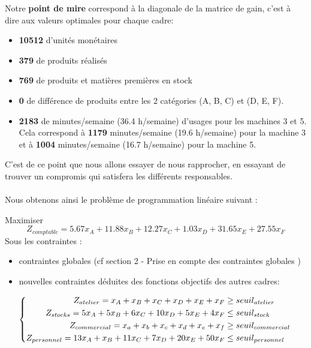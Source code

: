 \documentclass[12pt]{article}
\begin{document}
Notre \textbf{point de mire} correspond à la diagonale de la matrice de gain, c'est à dire aux valeurs optimales pour chaque cadre:
\begin{itemize}
\item \textbf{10512} d'unités monétaires
\item  \textbf{379} de produits réalisés
\item \textbf{769} de produits et matières premières en stock
\item \textbf{0} de différence de produits entre les 2 catégories (A, B, C) et (D, E, F).
\item \textbf{2183} de minutes/semaine (36.4 h/semaine) d'usages pour les machines 3 et 5. Cela correspond à \textbf{1179} minutes/semaine  (19.6 h/semaine)  pour la machine 3 et à \textbf{1004} minutes/semaine  (16.7 h/semaine)  pour la machine 5.
\end{itemize}
C'est de ce point que nous allons essayer de nous rapprocher, en essayant de trouver un compromis qui satisfera les différents responsables.
\\ \\
Nous obtenons ainsi le problème de programmation linéaire suivant :
\begin{tcolorbox}
Maximiser
\begin{equation*}
 Z_{comptable}= 5.67x_{A} +11.88x_{B} +12.27x_{C} +1.03x_{D} +31.65x_{E} +27.55x_{F}
\end{equation*}
Sous les contraintes :
\begin{itemize}
\item contraintes globales (cf section 2 - Prise en compte des contraintes globales )
\item nouvelles contraintes déduites des fonctions objectifs des autres cadres:\\
\end{itemize}
\begin{equation*}
\left\{
\begin{aligned}
   Z_{atelier}= x_{A} + x_{B} + x_{C} + x_{D} + x_{E} + x_{F} &\geq seuil_{atelier}
    \\
   Z_{stocks}= 5x_{A} + 5x_{B} + 6x_{C} + 10x_{D} + 5x_{E} + 4x_{F}
   &\leq seuil_{stock}
   \\
   Z_{commercial}=x_{a} + x_{b} + x_{c} + x_{d} + x_{e} + x_{f} &\geq seuil_{commercial}
   \\
   Z_{personnel}= 13x_{A} + x_{B} + 11x_{C} + 7x_{D} + 20x_{E} + 50x_{F}&\leq seuil_{personnel}
\end{aligned}
\right.
\\
\newline
\end{equation*}
\end{tcolorbox}
\end{document}
